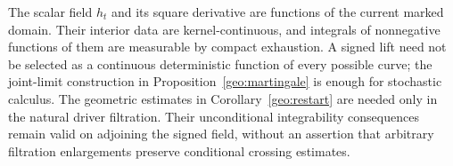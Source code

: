 \begin{remark}
\label{geo:filtration}
The scalar field \(h_t\) and its square derivative are functions of
the current marked domain. Their interior data are kernel-continuous,
and integrals of nonnegative functions of them are measurable by
compact exhaustion. A signed lift need not be selected as a
continuous deterministic function of every possible curve; the
joint-limit construction in Proposition~\ref{geo:martingale} is
enough for stochastic calculus. The geometric estimates in
Corollary~\ref{geo:restart} are needed only in the natural
driver filtration. Their unconditional integrability consequences
remain valid on adjoining the signed field, without an assertion
that arbitrary filtration enlargements preserve conditional
crossing estimates.
\end{remark}
